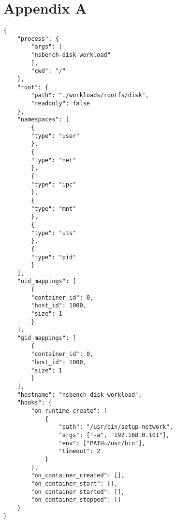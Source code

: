 \chapter{Appendix A}
\begin{lstlisting}[style={syscalls}, label={code:oci-config.json}, caption={Open Containers Initiative Configuration File Example}]
{
    "process": {
        "args": [
        "nsbench-disk-workload"
        ],
        "cwd": "/"
    },
    "root": {
        "path": "./workloads/rootfs/disk",
        "readonly": false
    },
    "namespaces": [
        {
        "type": "user"
        },
        {
        "type": "net"
        },
        {
        "type": "ipc"
        },
        {
        "type": "mnt"
        },
        {
        "type": "uts"
        },
        {
        "type": "pid"
        }
    ],
    "uid_mappings": [
        {
        "container_id": 0,
        "host_id": 1000,
        "size": 1
        }
    ],
    "gid_mappings": [
        {
        "container_id": 0,
        "host_id": 1000,
        "size": 1
        }
    ],
    "hostname": "nsbench-disk-workload",
    "hooks": { 
        "on_runtime_create": [
            {
                "path": "/usr/bin/setup-network",
                "args": ["-a", "192.168.0.101"],
                "env": ["PATH=/usr/bin"],
                "timeout": 2
            }
        ],
        "on_container_created": [],
        "on_container_start": [],
        "on_container_started": [],
        "on_container_stopped": []
    }
}
\end{lstlisting}